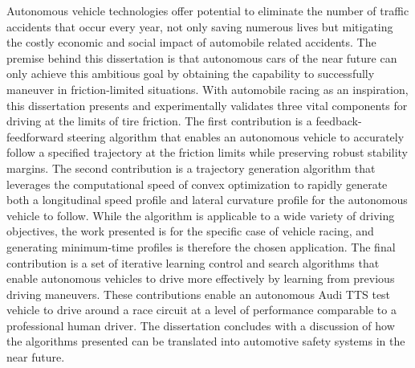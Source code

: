 
Autonomous vehicle technologies offer potential to eliminate the number of traffic accidents
that occur every year, not only saving numerous lives but mitigating the costly economic and social
impact of automobile related accidents. The premise behind this dissertation is that autonomous cars of the near
future can only achieve this ambitious goal by obtaining the capability to successfully maneuver in friction-limited situations. 
 With automobile racing as an inspiration, this dissertation presents and experimentally validates three vital components
 for driving at the limits of tire friction. The first contribution is a feedback-feedforward steering algorithm  
 that enables an autonomous vehicle to accurately follow a specified trajectory at the friction limits while preserving
 robust stability margins. The second contribution is a trajectory generation algorithm that leverages the computational speed of 
 convex optimization to rapidly generate both a longitudinal speed profile and lateral curvature profile for the autonomous vehicle to follow.
 While the algorithm is applicable to a wide variety of driving objectives, the work presented is for the specific case of vehicle racing,
 and generating minimum-time profiles is therefore the chosen application. The final contribution is a set of iterative learning control and
 search algorithms that enable autonomous vehicles to drive more effectively by learning from previous driving maneuvers. These contributions enable an autonomous Audi TTS test vehicle to 
 drive around a race circuit at a level of performance comparable to a professional human driver. The dissertation concludes
 with a discussion of how the algorithms presented can be translated into automotive safety systems in the near future. 
 
 


